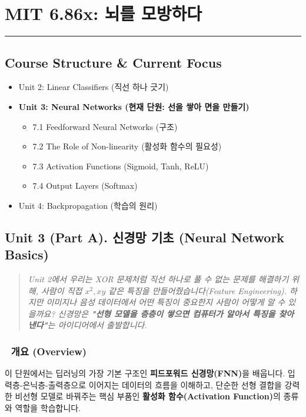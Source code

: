 \documentclass[11pt,a4paper]{book}
\theoremstyle{definition}
\begin{document}
\chapter{MIT 6.86x: 뇌를 모방하다}
\label{ch:lecture7}


\vspace{1cm}
\hrule
\vspace{1cm}

\section*{Course Structure \& Current Focus}
\begin{itemize}
    \item Unit 2: Linear Classifiers (직선 하나 긋기)
    \item \textbf{\textcolor{mainblue}{Unit 3: Neural Networks (현재 단원: 선을 쌓아 면을 만들기)}}
    \begin{itemize}
        \item 7.1 Feedforward Neural Networks (구조)
        \item 7.2 The Role of Non-linearity (활성화 함수의 필요성)
        \item 7.3 Activation Functions (Sigmoid, Tanh, ReLU)
        \item 7.4 Output Layers (Softmax)
    \end{itemize}
    \item Unit 4: Backpropagation (학습의 원리)
\end{itemize}


\section{Unit 3 (Part A). 신경망 기초 (Neural Network Basics)}

\begin{quote}
\textit{Unit 2에서 우리는 XOR 문제처럼 직선 하나로 풀 수 없는 문제를 해결하기 위해, 사람이 직접 $x^2, xy$ 같은 특징을 만들어줬습니다(Feature Engineering). 하지만 이미지나 음성 데이터에서 어떤 특징이 중요한지 사람이 어떻게 알 수 있을까요? 신경망은 \textbf{"선형 모델을 층층이 쌓으면 컴퓨터가 알아서 특징을 찾아낸다"}는 아이디어에서 출발합니다.}
\end{quote}

\subsection*{📌 개요 (Overview)}
이 단원에서는 딥러닝의 가장 기본 구조인 \textbf{피드포워드 신경망(FNN)}을 배웁니다. 입력층-은닉층-출력층으로 이어지는 데이터의 흐름을 이해하고, 단순한 선형 결합을 강력한 비선형 모델로 바꿔주는 핵심 부품인 \textbf{활성화 함수(Activation Function)}의 종류와 역할을 학습합니다.
\end{document}

